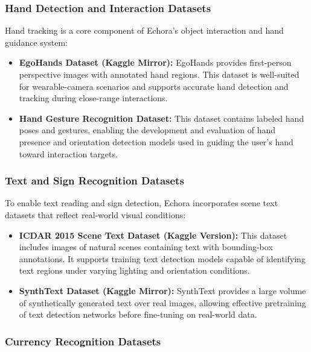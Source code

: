 \subsubsection{Hand Detection and Interaction Datasets}

Hand tracking is a core component of Echora’s object interaction and hand guidance system:

\begin{itemize}
    \item \textbf{EgoHands Dataset (Kaggle Mirror):}  
    EgoHands provides first-person perspective images with annotated hand regions. This
    dataset is well-suited for wearable-camera scenarios and supports accurate hand
    detection and tracking during close-range interactions.

    \item \textbf{Hand Gesture Recognition Dataset:}  
    This dataset contains labeled hand poses and gestures, enabling the development and
    evaluation of hand presence and orientation detection models used in guiding the user’s
    hand toward interaction targets.
\end{itemize}

\subsubsection{Text and Sign Recognition Datasets}

To enable text reading and sign detection, Echora incorporates scene text datasets that reflect
real-world visual conditions:

\begin{itemize}
    \item \textbf{ICDAR 2015 Scene Text Dataset (Kaggle Version):}  
    This dataset includes images of natural scenes containing text with bounding-box
    annotations. It supports training text detection models capable of identifying text
    regions under varying lighting and orientation conditions.

    \item \textbf{SynthText Dataset (Kaggle Mirror):}  
    SynthText provides a large volume of synthetically generated text over real images,
    allowing effective pretraining of text detection networks before fine-tuning on
    real-world data.
\end{itemize}

\subsubsection{Currency Recognition Datasets}

